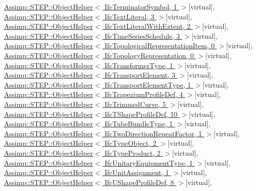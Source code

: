 \hyperlink{struct_assimp_1_1_s_t_e_p_1_1_object_helper}{Assimp\+::\+S\+T\+E\+P\+::\+Object\+Helper$<$ Ifc\+Terminator\+Symbol, 1 $>$}{\ttfamily  \mbox{[}virtual\mbox{]}}, \hyperlink{struct_assimp_1_1_s_t_e_p_1_1_object_helper}{Assimp\+::\+S\+T\+E\+P\+::\+Object\+Helper$<$ Ifc\+Text\+Literal, 3 $>$}{\ttfamily  \mbox{[}virtual\mbox{]}}, \hyperlink{struct_assimp_1_1_s_t_e_p_1_1_object_helper}{Assimp\+::\+S\+T\+E\+P\+::\+Object\+Helper$<$ Ifc\+Text\+Literal\+With\+Extent, 2 $>$}{\ttfamily  \mbox{[}virtual\mbox{]}}, \hyperlink{struct_assimp_1_1_s_t_e_p_1_1_object_helper}{Assimp\+::\+S\+T\+E\+P\+::\+Object\+Helper$<$ Ifc\+Time\+Series\+Schedule, 3 $>$}{\ttfamily  \mbox{[}virtual\mbox{]}}, \hyperlink{struct_assimp_1_1_s_t_e_p_1_1_object_helper}{Assimp\+::\+S\+T\+E\+P\+::\+Object\+Helper$<$ Ifc\+Topological\+Representation\+Item, 0 $>$}{\ttfamily  \mbox{[}virtual\mbox{]}}, \hyperlink{struct_assimp_1_1_s_t_e_p_1_1_object_helper}{Assimp\+::\+S\+T\+E\+P\+::\+Object\+Helper$<$ Ifc\+Topology\+Representation, 0 $>$}{\ttfamily  \mbox{[}virtual\mbox{]}}, \hyperlink{struct_assimp_1_1_s_t_e_p_1_1_object_helper}{Assimp\+::\+S\+T\+E\+P\+::\+Object\+Helper$<$ Ifc\+Transformer\+Type, 1 $>$}{\ttfamily  \mbox{[}virtual\mbox{]}}, \hyperlink{struct_assimp_1_1_s_t_e_p_1_1_object_helper}{Assimp\+::\+S\+T\+E\+P\+::\+Object\+Helper$<$ Ifc\+Transport\+Element, 3 $>$}{\ttfamily  \mbox{[}virtual\mbox{]}}, \hyperlink{struct_assimp_1_1_s_t_e_p_1_1_object_helper}{Assimp\+::\+S\+T\+E\+P\+::\+Object\+Helper$<$ Ifc\+Transport\+Element\+Type, 1 $>$}{\ttfamily  \mbox{[}virtual\mbox{]}}, \hyperlink{struct_assimp_1_1_s_t_e_p_1_1_object_helper}{Assimp\+::\+S\+T\+E\+P\+::\+Object\+Helper$<$ Ifc\+Trapezium\+Profile\+Def, 4 $>$}{\ttfamily  \mbox{[}virtual\mbox{]}}, \hyperlink{struct_assimp_1_1_s_t_e_p_1_1_object_helper}{Assimp\+::\+S\+T\+E\+P\+::\+Object\+Helper$<$ Ifc\+Trimmed\+Curve, 5 $>$}{\ttfamily  \mbox{[}virtual\mbox{]}}, \hyperlink{struct_assimp_1_1_s_t_e_p_1_1_object_helper}{Assimp\+::\+S\+T\+E\+P\+::\+Object\+Helper$<$ Ifc\+T\+Shape\+Profile\+Def, 10 $>$}{\ttfamily  \mbox{[}virtual\mbox{]}}, \hyperlink{struct_assimp_1_1_s_t_e_p_1_1_object_helper}{Assimp\+::\+S\+T\+E\+P\+::\+Object\+Helper$<$ Ifc\+Tube\+Bundle\+Type, 1 $>$}{\ttfamily  \mbox{[}virtual\mbox{]}}, \hyperlink{struct_assimp_1_1_s_t_e_p_1_1_object_helper}{Assimp\+::\+S\+T\+E\+P\+::\+Object\+Helper$<$ Ifc\+Two\+Direction\+Repeat\+Factor, 1 $>$}{\ttfamily  \mbox{[}virtual\mbox{]}}, \hyperlink{struct_assimp_1_1_s_t_e_p_1_1_object_helper}{Assimp\+::\+S\+T\+E\+P\+::\+Object\+Helper$<$ Ifc\+Type\+Object, 2 $>$}{\ttfamily  \mbox{[}virtual\mbox{]}}, \hyperlink{struct_assimp_1_1_s_t_e_p_1_1_object_helper}{Assimp\+::\+S\+T\+E\+P\+::\+Object\+Helper$<$ Ifc\+Type\+Product, 2 $>$}{\ttfamily  \mbox{[}virtual\mbox{]}}, \hyperlink{struct_assimp_1_1_s_t_e_p_1_1_object_helper}{Assimp\+::\+S\+T\+E\+P\+::\+Object\+Helper$<$ Ifc\+Unitary\+Equipment\+Type, 1 $>$}{\ttfamily  \mbox{[}virtual\mbox{]}}, \hyperlink{struct_assimp_1_1_s_t_e_p_1_1_object_helper}{Assimp\+::\+S\+T\+E\+P\+::\+Object\+Helper$<$ Ifc\+Unit\+Assignment, 1 $>$}{\ttfamily  \mbox{[}virtual\mbox{]}}, \hyperlink{struct_assimp_1_1_s_t_e_p_1_1_object_helper}{Assimp\+::\+S\+T\+E\+P\+::\+Object\+Helper$<$ Ifc\+U\+Shape\+Profile\+Def, 8 $>$}{\ttfamily  \mbox{[}virtual\mbox{]}}, 